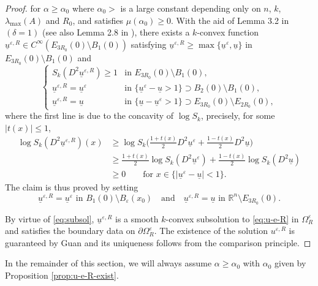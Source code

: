 \documentclass[reqno]{amsart}
\theoremstyle{remark}
\theoremstyle{definition}
\numberwithin{equation}{section}
\begin{document}
\begin{proof}
for $\alpha\geq\alpha_0$ where $\alpha_0>$ is a large constant depending only on $n$, $k$, $\lambda_{\text{max}}(A)$ and $R_0$, and satisfies $\mu({\alpha_0})\geq0$. With the aid of Lemma 3.2 in \cite{P.Guan-2002} $(\delta=1)$ (see also Lemma 2.8 in \cite{Ma-Zhang}), there exists a $k$-convex function $\underline{u}^{\varepsilon,R}\in C^\infty(E_{3R_0}(0)\setminus B_1(0))$ satisfying $\underline{u}^{\varepsilon,R}\geq\max\{\underline{u}^\varepsilon, \underline u\}$ in $E_{3R_0}(0)\setminus B_1(0)$ and 
\begin{equation*}
		\begin{cases}
			S_k(D^2\underline{u}^{\varepsilon,R})\geq 1 & \text{in }E_{3R_0}(0)\setminus B_1(0), \\
			\underline{u}^{\varepsilon,R}=\underline{u}^{\varepsilon} & \text{in }\{\underline{u}^{\varepsilon}
			-\underline{u}>1\}\supset B_2(0)\setminus B_1(0), \\
			\underline{u}^{\varepsilon,R}=\underline{u} & \text{in }\{\underline{u}-\underline{u}^{\varepsilon}>1\}\supset E_{3R_0}(0)\setminus E_{2R_0}(0),
		\end{cases}
\end{equation*}
where the first line is due to the concavity of $\log S_k$, precisely, for some $|t(x)|\leq1$,
\[
\begin{split}
	\log S_k(D^2\underline{u}^{\varepsilon,R})(x) & \geq\log S_k\bigg(\frac{1+t(x)}{2}D^2\underline{u}^{\varepsilon}+\frac{1-t(x)}{2}D^2\underline{u}\bigg) \\
	& \geq\frac{1+t(x)}{2}\log S_k(D^2\underline{u}^{\varepsilon})+\frac{1-t(x)}{2}\log S_k(D^2\underline{u}) \\
	& \geq0\quad\quad\text{for }x\in\{|\underline{u}^{\varepsilon}
	-\underline{u}|<1\}.
\end{split}
\]  
The claim is thus proved by setting 
$$\underline{u}^{\varepsilon,R}=\underline{u}^\varepsilon\text{ in }B_1(0)\setminus B_\varepsilon(x_0)\quad\text{and}\quad \underline{u}^{\varepsilon,R}=\underline{u}\text{ in }\mathbb{R}^n\setminus E_{3R_0}(0).$$

By virtue of \eqref{eq:subsol}, $\underline{u}^{\varepsilon,R}$ is a smooth $k$-convex  subsolution to \eqref{eq:u-e-R} in $\Omega_R^\varepsilon$ and satisfies the boundary data on $\partial \Omega_R^\varepsilon$. The existence of the solution $u^{\varepsilon,R}$ is guaranteed by Guan \cite{Guan-Duke} and its uniqueness follows from the comparison principle.
\end{proof}

In the remainder of this section, we will always assume $\alpha\geq\alpha_0$ with $\alpha_0$ given by Proposition \ref{prop:u-e-R-exist}.
\end{document}
